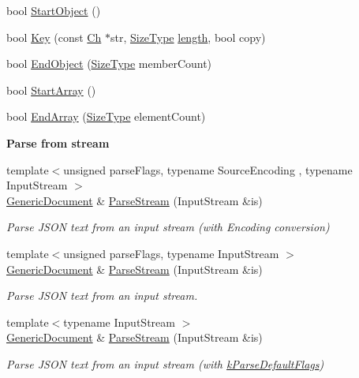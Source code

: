 \begin{DoxyCompactItemize}
\item 
bool \hyperlink{classGenericDocument_abb1417fde52cc34cb340e3b50a3295da}{Start\+Object} ()
\item 
bool \hyperlink{classGenericDocument_a600d0950baabbcab11197cacb1459c7a}{Key} (const \hyperlink{classGenericValue_ade0e0ce64ccd5d852da57a35e720bafb}{Ch} $\ast$str, \hyperlink{rapidjson_8h_a5ed6e6e67250fadbd041127e6386dcb5}{Size\+Type} \hyperlink{imgui__impl__opengl3__loader_8h_a011fc24f10426c01349e94a4edd4b0d5}{length}, bool copy)
\item 
bool \hyperlink{classGenericDocument_a42f2df68f9c9d8b88a15b609716867d9}{End\+Object} (\hyperlink{rapidjson_8h_a5ed6e6e67250fadbd041127e6386dcb5}{Size\+Type} member\+Count)
\item 
bool \hyperlink{classGenericDocument_ae12c513c61745ae731a47b1ca33db063}{Start\+Array} ()
\item 
bool \hyperlink{classGenericDocument_a14097c833bed1a9c7be064ea619c887f}{End\+Array} (\hyperlink{rapidjson_8h_a5ed6e6e67250fadbd041127e6386dcb5}{Size\+Type} element\+Count)
\end{DoxyCompactItemize}
\begin{Indent}\textbf{ Parse from stream}\par
\begin{DoxyCompactItemize}
\item 
{\footnotesize template$<$unsigned parse\+Flags, typename Source\+Encoding , typename Input\+Stream $>$ }\\\hyperlink{classGenericDocument}{Generic\+Document} \& \hyperlink{classGenericDocument_afe94c0abc83a20f2d7dc1ba7677e6238}{Parse\+Stream} (Input\+Stream \&is)
\begin{DoxyCompactList}\small\item\em Parse J\+S\+ON text from an input stream (with Encoding conversion) \end{DoxyCompactList}\item 
{\footnotesize template$<$unsigned parse\+Flags, typename Input\+Stream $>$ }\\\hyperlink{classGenericDocument}{Generic\+Document} \& \hyperlink{classGenericDocument_a6e154066c6f5024b91aaab25e03700e3}{Parse\+Stream} (Input\+Stream \&is)
\begin{DoxyCompactList}\small\item\em Parse J\+S\+ON text from an input stream. \end{DoxyCompactList}\item 
{\footnotesize template$<$typename Input\+Stream $>$ }\\\hyperlink{classGenericDocument}{Generic\+Document} \& \hyperlink{classGenericDocument_abe07ededbe9aaceb0058e3d254892b71}{Parse\+Stream} (Input\+Stream \&is)
\begin{DoxyCompactList}\small\item\em Parse J\+S\+ON text from an input stream (with \hyperlink{reader_8h_ab7be7dabe6ffcba60fad441505583450a9104b0946d648e9467cb7a967401ec80}{k\+Parse\+Default\+Flags}) \end{DoxyCompactList}\end{DoxyCompactItemize}
\end{Indent}
